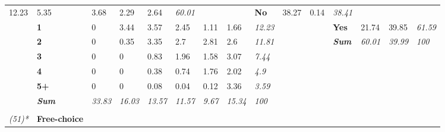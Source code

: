\begin{table}
{\begin{threeparttable}
\begin{tabular}{lllllllllllllll}
  \cellcolor[HTML]{DFDFDF}12.23 &
  \cellcolor[HTML]{F1F1F1}5.35 &
  \cellcolor[HTML]{F6F6F6}3.68 &
  \cellcolor[HTML]{F9F9F9}2.29 &
  \cellcolor[HTML]{F9F9F9}2.64 &
  \textit{60.01} &
   &
   &
  \textbf{No} &
  \cellcolor[HTML]{AAAAAA}38.27 &
  \cellcolor[HTML]{FFFFFF}0.14 &
  \textit{38.41} \\
 &
  \textbf{1} &
  \cellcolor[HTML]{FFFFFF}0 &
  \cellcolor[HTML]{F6F6F6}3.44 &
  \cellcolor[HTML]{F6F6F6}3.57 &
  \cellcolor[HTML]{F9F9F9}2.45 &
  \cellcolor[HTML]{FDFDFD}1.11 &
  \cellcolor[HTML]{FBFBFB}1.66 &
  \textit{12.23} &
   &
   &
  \textbf{Yes} &
  \cellcolor[HTML]{CFCFCF}21.74 &
  \cellcolor[HTML]{A6A6A6}39.85 &
  \textit{61.59} \\
 &
  \textbf{2} &
  \cellcolor[HTML]{FFFFFF}0 &
  \cellcolor[HTML]{FFFFFF}0.35 &
  \cellcolor[HTML]{F7F7F7}3.35 &
  \cellcolor[HTML]{F8F8F8}2.7 &
  \cellcolor[HTML]{F8F8F8}2.81 &
  \cellcolor[HTML]{F9F9F9}2.6 &
  \textit{11.81} &
   &
   &
  \textit{\textbf{Sum}} &
  \textit{60.01} &
  \textit{39.99} &
  \textit{100} \\
 &
  \textbf{3} &
  \cellcolor[HTML]{FFFFFF}0 &
  \cellcolor[HTML]{FFFFFF}0 &
  \cellcolor[HTML]{FDFDFD}0.83 &
  \cellcolor[HTML]{FAFAFA}1.96 &
  \cellcolor[HTML]{FBFBFB}1.58 &
  \cellcolor[HTML]{F7F7F7}3.07 &
  \textit{7.44} &
   &
   &
   &
   &
   &
  \textit{} \\
 &
  \textbf{4} &
  \cellcolor[HTML]{FFFFFF}0 &
  \cellcolor[HTML]{FFFFFF}0 &
  \cellcolor[HTML]{FFFFFF}0.38 &
  \cellcolor[HTML]{FEFEFE}0.74 &
  \cellcolor[HTML]{FBFBFB}1.76 &
  \cellcolor[HTML]{FAFAFA}2.02 &
  \textit{4.9} &
   &
   &
   &
   &
   &
  \textit{} \\
 &
  \textbf{5+} &
  \cellcolor[HTML]{FFFFFF}0 &
  \cellcolor[HTML]{FFFFFF}0 &
  \cellcolor[HTML]{FFFFFF}0.08 &
  \cellcolor[HTML]{FFFFFF}0.04 &
  \cellcolor[HTML]{FFFFFF}0.12 &
  \cellcolor[HTML]{F7F7F7}3.36 &
  \textit{3.59} &
   &
   &
   &
   &
   &
  \textit{} \\
\textit{} &
  \textit{\textbf{Sum}} &
  \textit{33.83} &
  \textit{16.03} &
  \textit{13.57} &
  \textit{11.57} &
  \textit{9.67} &
  \textit{15.34} &
  \textit{100} &
  \textit{} &
  \textit{} &
  \textit{} &
  \textit{} &
  \textit{} &
  \textit{} \\
\textit{} &
  \textit{\textbf{}} &
  \textit{} &
  \textit{} &
  \textit{} &
  \textit{} &
  \textit{} &
  \textit{} &
  \textit{} &
  \textit{} &
  \textit{} &
  \textit{} &
  \textit{} &
  \textit{} &
  \textit{} \\
\textit{(51)*} &
  \textbf{Free-choice} &

\end{tabular}
\end{threeparttable}}
\end{table}
